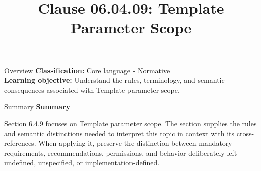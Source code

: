 \documentclass[10pt,letterpaper]{article}
\title{Clause 06.04.09: Template Parameter Scope}
\author{}
\date{}
\begin{document}
\maketitle
\begin{CornellOverviewBox}{Overview}
\textbf{Classification:} Core language - Normative\\[2pt]
\textbf{Learning objective:} Understand the rules, terminology, and semantic consequences associated with Template parameter scope.
\end{CornellOverviewBox}\begin{CornellSummaryBox}{Summary}
{\sffamily\bfseries\color{Accent} Summary}\par\vspace{3pt}Section 6.4.9 focuses on Template parameter scope. The section supplies the rules and semantic distinctions needed to interpret this topic in context with its cross-references. When applying it, preserve the distinction between mandatory requirements, recommendations, permissions, and behavior deliberately left undefined, unspecified, or implementation-defined.
\end{CornellSummaryBox}
\end{document}
